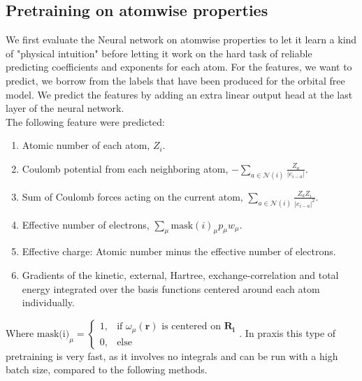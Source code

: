 \subsection{Pretraining on atomwise properties}
We first evaluate the Neural network on atomwise properties to let it learn a kind of "physical intuition" before letting it work on the hard task of reliable predicting coefficients and exponents for each atom.
For the features, we want to predict, we borrow from the labels that have been produced for the orbital free model.
We predict the features by adding an extra linear output head at the last layer of the neural network.\\
The following feature were predicted:\\
\begin{enumerate}
    \item Atomic number of each atom, $Z_i$.
    \item Coulomb potential from each neighboring atom, $-\sum\limits_{a \in \mathcal{N}(i)} \frac{Z_a}{|e_{i-a}|}$.
    \item Sum of Coulomb forces acting on the current atom, $\sum\limits_{a \in \mathcal{N}(i)} \frac{Z_a Z_i}{|e_{i-a}|^2}$.
    \item Effective number of electrons, $\sum\limits_{\mu} \text{mask}(i)_\mu p_\mu w_\mu$.
    \item Effective charge: Atomic number minus the effective number of electrons.
    \item Gradients of the kinetic, external, Hartree, exchange-correlation and total energy integrated over the basis functions centered around each atom individually.
\end{enumerate}
Where $\text{mask(i)}_\mu =
\begin{cases}
1, & \text{if } \omega_\mu(\mathbf{r}) \text{ is centered on } \mathbf{R_i} \\
0, & \text{else}
\end{cases}$.
In praxis this type of pretraining is very fast, as it involves no integrals and can be run with a high batch size, compared to the following methods.
